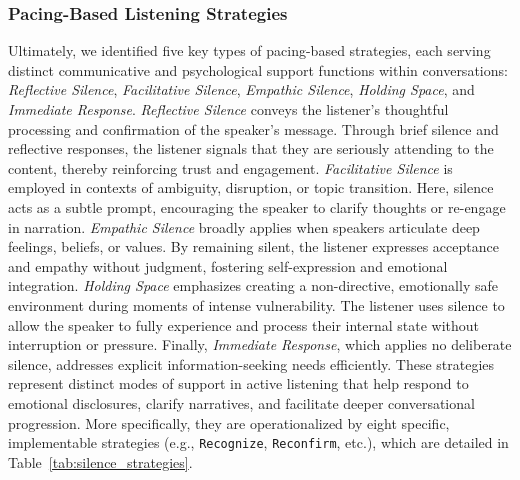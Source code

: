 \subsubsection{Pacing-Based Listening Strategies}
Ultimately, we identified five key types of pacing-based strategies, each serving distinct communicative and psychological support functions within conversations: \emph{Reflective Silence}, \emph{Facilitative Silence}, \emph{Empathic Silence}, \emph{Holding Space}, and \emph{Immediate Response}. \emph{Reflective Silence} conveys the listener's thoughtful processing and confirmation of the speaker's message. Through brief silence and reflective responses, the listener signals that they are seriously attending to the content, thereby reinforcing trust and engagement. \emph{Facilitative Silence} is employed in contexts of ambiguity, disruption, or topic transition. Here, silence acts as a subtle prompt, encouraging the speaker to clarify thoughts or re-engage in narration. \emph{Empathic Silence} broadly applies when speakers articulate deep feelings, beliefs, or values. By remaining silent, the listener expresses acceptance and empathy without judgment, fostering self-expression and emotional integration. \emph{Holding Space} emphasizes creating a non-directive, emotionally safe environment during moments of intense vulnerability. The listener uses silence to allow the speaker to fully experience and process their internal state without interruption or pressure. Finally, \emph{Immediate Response}, which applies no deliberate silence, addresses explicit information-seeking needs efficiently.
These strategies represent distinct modes of support in active listening that help respond to emotional disclosures, clarify narratives, and facilitate deeper conversational progression.
More specifically, they are operationalized by eight specific, implementable strategies (e.g., \texttt{Recognize}, \texttt{Reconfirm}, etc.), which are detailed in Table~\ref{tab:silence_strategies}.

